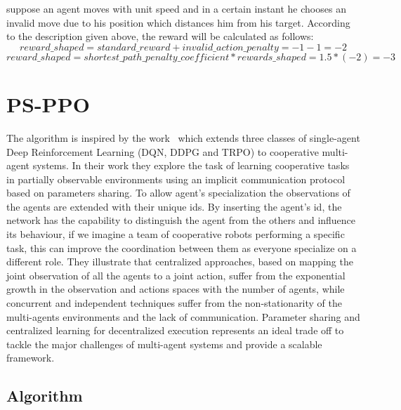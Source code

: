 \documentclass[11pt, a4paper, hidelinks]{report}
\begin{document}
suppose an agent moves with unit speed and in a certain instant he chooses an invalid move due to his position which distances him from his target.
According to the description given above, the reward will be calculated as follows:
\begin{displaymath}{reward\_shaped = standard\_reward + invalid\_action\_penalty = -1 -1 = -2}\end{displaymath}
\begin{displaymath}{reward\_shaped = shortest\_path\_penalty\_coefficient * rewards\_shaped = 1.5 * (-2)= -3}\end{displaymath}

\section{PS-PPO}\label{sec:ps-ppo}

The algorithm is inspired by the work~\citep{ps-ppo-paper} which extends three classes of single-agent Deep Reinforcement Learning (DQN, DDPG and TRPO) to cooperative multi-agent systems.
In their work they explore the task of learning cooperative tasks in partially observable environments using an implicit communication protocol based on parameters sharing.
To allow agent's specialization the observations of the agents are extended with their unique ids.
By inserting the agent's id, the network has the capability to distinguish the agent from the others and influence its behaviour, if we imagine a team of cooperative robots performing a specific task, this can improve the coordination between them as everyone specialize on a different role.
They illustrate that centralized approaches, based on mapping the joint observation of all the agents to a joint action, suffer from the exponential growth in the observation and actions spaces with the number of agents, while concurrent and independent techniques suffer from the non-stationarity of the multi-agents environments and the lack of communication.
Parameter sharing and centralized learning for decentralized execution represents an ideal trade off to tackle the major challenges of multi-agent systems and provide a scalable framework.

\subsection{Algorithm}\label{subsec:algorithm}
\end{document}

